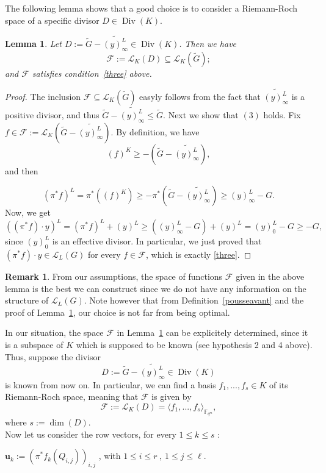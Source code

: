 \documentclass[10pt]{article}
\newtheorem{lem1}[thm]{Lemma}
\theoremstyle{definition}
\newtheorem{rq1}[thm]{Remark}
\theoremstyle{definition}
\theoremstyle{definition}
\newcommand{\cd}{\cdot}
\newcommand{\fqm}{\mathbb{F}_{q^m}}
\newcommand{\su}{\subseteq}
\newcommand{\Div}{\operatorname{Div}}
\newcommand{\calL}{\mathcal{L}}
\begin{document}
The following lemma shows that a good choice is to consider a Riemann-Roch space of a specific divisor $D \in \Div(K)$.   

\begin{lem1} \label{constructionD} Let $D := \widetilde{G}-\widetilde{(y)^L_{\infty}} \in \Div(K)$. Then we have
\[\mathcal{F} := \calL_K(D) \su \calL_K(\tilde{G});\]
and $\mathcal{F}$ satisfies condition~\eqref{three} above.
\end{lem1}


\begin{proof}
The inclusion $\mathcal{F} \su \calL_K(\tilde{G})$ easyly follows from the fact that $\widetilde{(y)^L_{\infty}}$ is a positive divisor, and thus $\tilde{G}-\widetilde{(y)^L_{\infty}} \leq \tilde{G}$. Next we show that $(3)$ holds. Fix $f \in \mathcal{F} :=  \calL_K\left(\tilde{G}-\widetilde{(y)^L_{\infty}}\right)$. By definition, we have
\[(f)^K \geq -\left(\tilde{G}-\widetilde{(y)^L_{\infty}}\right),\]
and then

\[(\pi^*f)^L = \pi^*((f)^K) \geq -\pi^*\left(\tilde{G}-\widetilde{(y)^L_{\infty}}\right) \geq (y)^L_{\infty} - G.\]
Now, we get 
\[((\pi^*f) \cd y)^L = (\pi^*f)^L  + (y)^L \geq  ((y)^L_{\infty} - G)+(y)^L = (y)^L_0 - G \geq -G,\]
since $(y)^L_0$ is an effective divisor. In particular, we just proved that $(\pi^*f) \cd y \in \calL_L(G)$ for every $f \in \mathcal{F}$, which is exactly \eqref{three}.
\end{proof}

\begin{rq1}  \label{remark5}
From our assumptions, the space of functions $\mathcal{F}$ given in the above lemma is the best we can construct since we do not have any information on the structure of $\calL_L(G)$. Note however that from Definition~\ref{pousseavant} and the proof of Lemma~\ref{constructionD}, our choice is not far from being optimal.  
\end{rq1}

In our situation, the space $\mathcal{F}$ in Lemma~\ref{constructionD} can be explicitely determined, since it is a subspace of $K$ which is supposed to be known (see hypothesis 2 and 4 above). Thus, suppose the divisor 
\begin{equation} \label{four}
D := \tilde{G} - \widetilde{(y)^L_{\infty}} \in \Div(K)
\end{equation}
is known from now on. In particular, we can find a basis $f_1,...,f_s \in K$ of its Riemann-Roch space, meaning that $\mathcal{F}$ is given by
\[\mathcal{F} := \calL_K(D) = \langle f_1,...,f_s \rangle_{\fqm},\]
where $s := \dim(D)$. \\
Now let us consider the row vectors, for every $1 \leq k \leq s$ :
\begin{center}
$\mathbf{u}_{k}:= \left(\pi^*f_k(Q_{i,j})\right)_{i,j}$ , with $1 \leq i \leq r \ , \ 1 \leq j \leq \ell$.
\end{center}
\end{document}
